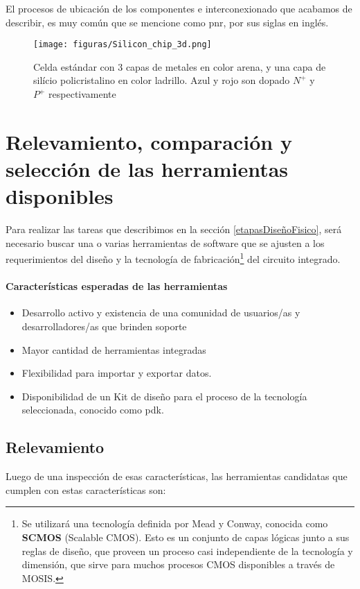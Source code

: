 El procesos de ubicación de los componentes e interconexionado que acabamos de describir, es muy común que se mencione como \gls{pnr}, por sus siglas en inglés.



\begin{figure}[h]
\centering
\texttt{[image: figuras/Silicon\_chip\_3d.png]}
  \caption{Celda estándar con 3 capas de metales en color arena, y una capa de silício policristalino en color ladrillo. Azul y rojo son dopado $N^+$ y $P^+$ respectivamente}
  \label{fig:routing}
\end{figure}

\section{Relevamiento, comparación y selección de las herramientas disponibles}
Para realizar las tareas que describimos en la sección \ref{etapasDiseñoFisico}, será necesario buscar una o varias herramientas de software que se ajusten a los requerimientos del diseño y la tecnología de fabricación\footnote{Se utilizará una tecnología definida por Mead y Conway\cite{mead-conway80}, conocida como  \textbf{SCMOS} (Scalable CMOS).
Esto es un conjunto de capas lógicas junto a sus reglas de diseño, que proveen un proceso casi independiente de la tecnología y dimensión, que sirve para muchos procesos CMOS disponibles a través de MOSIS.} del circuito integrado.

\paragraph{Características esperadas de las herramientas}
\begin{itemize}
\item Desarrollo activo y existencia de una comunidad de usuarios/as y desarrolladores/as que brinden soporte
\item Mayor cantidad de herramientas integradas
\item Flexibilidad para importar y exportar datos. 
\item Disponibilidad de un Kit de diseño para el proceso de la tecnología seleccionada, conocido como \gls{pdk}.
\end{itemize}

\subsection{Relevamiento}
Luego de una inspección de esas características, las herramientas candidatas que cumplen con estas características son:

